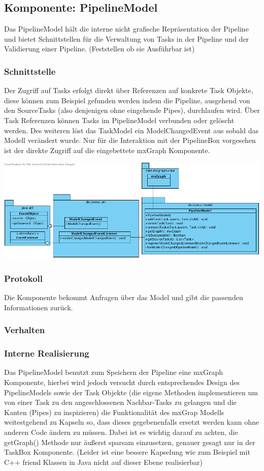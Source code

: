 \documentclass[a4paper,12pt]{scrartcl}
\begin{document}
\newpage
\subsection{Komponente: PipelineModel}
Das PipelineModel hält die interne nicht grafische Repräsentation der Pipeline und bietet Schnittstellen für die Verwaltung von Tasks in der Pipeline und der Validierung einer Pipeline. (Feststellen ob sie Ausführbar ist)
\subsubsection{Schnittstelle}
Der Zugriff auf Tasks erfolgt direkt über Referenzen auf konkrete Task Objekte, diese können zum Beispiel gefunden werden
indem die Pipeline, ausgehend von den SourceTasks (also denjenigen ohne eingehende Pipes), durchlaufen wird. Über Task Referenzen können Tasks im PipelineModel verbunden oder gelöscht werden. Des weiteren löst das TaskModel ein ModelChangedEvent aus sobald das Modell verändert wurde. Nur für die Interaktion mit der PipelineBox vorgesehen ist der direkte Zugriff auf die eingebettete mxGraph Komponente.
\begin{center}
\includegraphics[width=17cm]{Schnittstelle_PipelineModel.png}
\end{center}
\subsubsection{Protokoll}
Die Komponente bekommt Anfragen über das Model und gibt die passenden Informationen zurück.
\subsubsection{Verhalten}
\subsubsection{Interne Realisierung}
Das PipelineModel benutzt zum Speichern der Pipeline eine mxGraph Komponente, hierbei wird jedoch versucht durch entsprechendes Design des PipelineModels sowie der Task Objekte (die eigene Methoden implementieren um von einer Task zu
den angeschlossenen Nachbar-Tasks zu gelangen und die Kanten (Pipes) zu inspizieren) die Funktionalität des mxGrap Modells
weitestgehend zu Kapseln so, dass dieses gegebenenfalls ersetzt werden kann ohne anderen Code ändern zu müssen.
Dabei ist es wichtig darauf zu achten, die getGraph() Methode nur äußerst sparsam einzusetzen, genauer gesagt nur in der TaskBox Komponente. (Leider ist eine bessere Kapselung wie zum Beispiel mit C++ friend Klassen in Java nicht auf dieser Ebene realisierbar)
\end{document}
